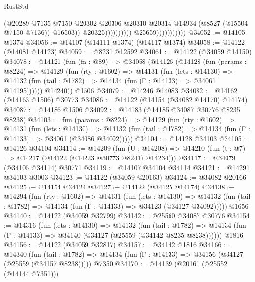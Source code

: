 \begin{lexlean}{RustStd}
\begin{coremodule}
                                                (@20289
                                                  @7135
                                                  @7150
                                                  @20302
                                                  @20306
                                                  @20310
                                                  @20314
                                                  @14934
                                                  (@8527 (@15504 @7150 @7136))
                                                  @16503))
                                              @20325))))))))))
                          @25659)))))))))))
@34052 := @14105 @1374
@34056 := @14107 (@14111 @1374) (@14117 @1374)
@34058 := @14122 (@14081 @14123)
@34059 := @8231 @12592
@34061 := @14122 (@34059 @14150)
@34078 := @14121
    (fun (fn : @89) =>
    @34058
      (@14126
        (@14128
          (fun (params : @8224) =>
          @14129
            (fun (rty : @1602) =>
            @14131
              (fun (lets : @14130) =>
              @14132 (fun (tail : @1782) => @14134 (fun (Γ : @14133) => @34061 @14195))))))
        @14240))
    @1506
@34079 := @14246 @14083
@34082 := @14162 (@14163 @1506) @30773
@34086 := @14122 (@14154 (@34082 @14170) @14174)
@34087 := @14186 @1506
@34092 := @14183 (@14185 @34087 @30776 @8235 @8238)
@34103 := fun (params : @8224) =>
  @14129
    (fun (rty : @1602) =>
    @14131
      (fun (lets : @14130) =>
      @14132 (fun (tail : @1782) => @14134 (fun (Γ : @14133) => @34061 (@34086 @34092)))))
@34104 := @14128 @34103
@34105 := @14126 @34104
@34114 := @14209
    (fun (U : @14208) => @14210 (fun (t : @7) => @14217 (@14122 (@14223 @30773 @8241) @14234)))
@34117 := @34079 (@34105 @34114) @30771
@34119 := @14107 @34104 @34114
@34121 := @14291 @34103 @3003
@34123 := @14122 (@34059 @20163)
@34124 := @34082 @20166
@34125 := @14154 @34124
@34127 := @14122 (@34125 @14174)
@34138 := @14294
    (fun (rty : @1602) =>
    @14131
      (fun (lets : @14130) =>
      @14132 (fun (tail : @1782) => @14134 (fun (Γ : @14133) => @34123 (@34127 @34092)))))
    @1656
@34140 := @14122 (@34059 @32799)
@34142 := @25560 @34087 @30776
@34154 := @14316
    (fun (lets : @14130) =>
    @14132
      (fun (tail : @1782) =>
      @14134 (fun (Γ : @14133) => @34140 (@34127 (@25559 (@34142 @8235 @8238))))))
    @1816
@34156 := @14122 (@34059 @32817)
@34157 := @34142 @1816
@34166 := @14340
    (fun (tail : @1782) => @14134 (fun (Γ : @14133) => @34156 (@34127 (@25559 (@34157 @8238)))))
    @7350
@34170 := @14139 (@20161 (@25552 (@14144 @7351)))

\end{coremodule}
\end{lexlean}
